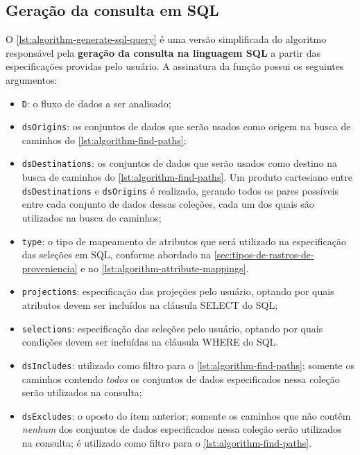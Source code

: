 \subsection{Geração da consulta em SQL}%
\label{subsec:geracao-da-consulta-em-sql}

O \autoref{lst:algorithm-generate-sql-query} é uma versão simplificada do algoritmo responsável pela \textbf{geração da consulta na linguagem SQL} a partir das especificações providas pelo usuário. A assinatura da função possui os seguintes argumentos:

\begin{itemize}
    \item \texttt{D}: o fluxo de dados a ser analisado;
    \item \texttt{dsOrigins}: os conjuntos de dados que serão usados como origem na busca de caminhos do \autoref{lst:algorithm-find-paths};
    \item \texttt{dsDestinations}: os conjuntos de dados que serão usados como destino na busca de caminhos do \autoref{lst:algorithm-find-paths}. Um produto cartesiano entre \texttt{dsDestinations} e \texttt{dsOrigins} é realizado, gerando todos os pares possíveis entre cada conjunto de dados dessas coleções, cada um dos quais são utilizados na busca de caminhos;
    \item \texttt{type}: o tipo de mapeamento de atributos que será utilizado na especificação das seleções em SQL, conforme abordado na \autoref{sec:tipos-de-rastros-de-proveniencia} e no \autoref{lst:algorithm-attribute-mappings}.
    \item \texttt{projections}: especificação das projeções pelo usuário, optando por quais atributos devem ser incluídos na cláusula \textsc{SELECT} do SQL;
    \item \texttt{selections}: especificação das seleções pelo usuário, optando por quais condições devem ser incluídas na cláusula \textsc{WHERE} do SQL.
    \item \texttt{dsIncludes}: utilizado como filtro para o \autoref{lst:algorithm-find-paths}; somente os caminhos contendo \emph{todos} os conjuntos de dados especificados nessa coleção serão utilizados na consulta;
    \item \texttt{dsExcludes}: o oposto do item anterior; somente os caminhos que não contêm \emph{nenhum} dos conjuntos de dados especificados nessa coleção serão utilizados na consulta; é utilizado como filtro para o \autoref{lst:algorithm-find-paths}.
\end{itemize}

